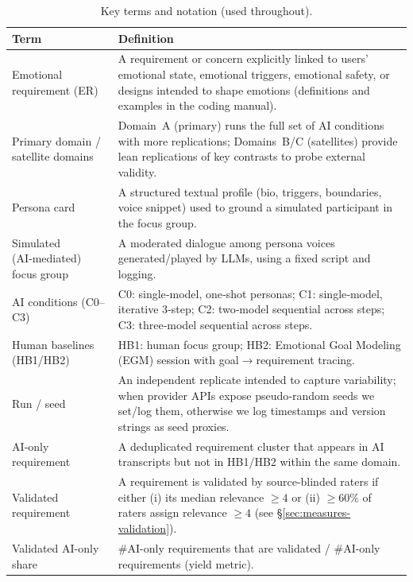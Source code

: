 \documentclass[acmsmall]{acmart}
\begin{document}
\begin{table}[t]
  \centering
  \caption{Key terms and notation (used throughout).}
  \label{tab:key-terms}
  \scriptsize 
  \setlength{\tabcolsep}{5pt}
  \begin{tabularx}{\linewidth}{p{3.4cm}X@{}}
    \toprule
    \textbf{Term} & \textbf{Definition} \\
    \midrule
    Emotional requirement (ER) & A requirement or concern explicitly linked to users’ emotional state, emotional triggers, emotional safety, or designs intended to shape emotions (definitions and examples in the coding manual). \\
    Primary domain / satellite domains & Domain~A (primary) runs the full set of AI conditions with more replications; Domains~B/C (satellites) provide lean replications of key contrasts to probe external validity. \\
    Persona card & A structured textual profile (bio, triggers, boundaries, voice snippet) used to ground a simulated participant in the focus group. \\
    Simulated (AI‑mediated) focus group & A moderated dialogue among persona voices generated/played by LLMs, using a fixed script and logging. \\
    AI conditions (C0--C3) & C0: single‑model, one‑shot personas; C1: single‑model, iterative 3‑step; C2: two‑model sequential across steps; C3: three‑model sequential across steps. \\
    Human baselines (HB1/HB2) & HB1: human focus group; HB2: Emotional Goal Modeling (EGM) session with goal$\rightarrow$requirement tracing. \\
    Run / seed & An independent replicate intended to capture variability; when provider APIs expose pseudo‑random seeds we set/log them, otherwise we log timestamps and version strings as seed proxies. \\
    AI‑only requirement & A deduplicated requirement cluster that appears in AI transcripts but not in HB1/HB2 within the same domain. \\
    Validated requirement & A requirement is validated by source-blinded raters if either (i) its median relevance $\geq 4$ or (ii) $\geq 60\%$ of raters assign relevance $\geq 4$ (see \S\ref{sec:measures-validation}). \\
    Validated AI-only share & \#AI-only requirements that are validated / \#AI-only requirements (yield metric). \\
    \bottomrule
  \end{tabularx}
\end{table}
\end{document}
